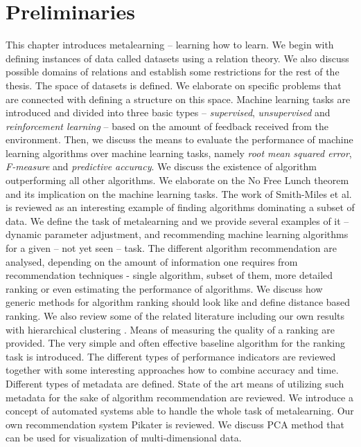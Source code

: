\chapter{Preliminaries}
\label{chapter:preliminaries}
This chapter introduces metalearning -- learning how to learn. We begin with defining instances of data called datasets using a relation theory. We also discuss possible domains of relations and establish some restrictions for the rest of the thesis. The space of datasets is defined. We elaborate on specific problems that are connected with defining a structure on this space. Machine learning tasks are introduced and divided into three basic types -- \emph{supervised}, \emph{unsupervised} and \emph{reinforcement learning} -- based on the amount of feedback received from the environment. Then, we discuss the means to evaluate the performance of machine learning algorithms over machine learning tasks, namely \emph{root mean squared error}, \emph{F-measure} and \emph{predictive accuracy}. We discuss the existence of algorithm outperforming all other algorithms. We elaborate on the No Free Lunch theorem \cite{NoFreeLunchTheorem} and its implication on the machine learning tasks. The work of Smith-Miles et al. is reviewed \cite{SmithMilesTowardsMeasuresOfAlgorithmPerformance} as an interesting example of finding algorithms dominating a subset of data. We define the task of metalearning and we provide several examples of it -- dynamic parameter adjustment, and recommending machine learning algorithms for a given -- not yet seen -- task. The different algorithm recommendation are analysed, depending on the amount of information one requires from recommendation techniques - single algorithm, subset of them, more detailed ranking or even estimating the performance of algorithms. We discuss how generic methods for algorithm ranking should look like and define distance based ranking. We also review some of the related literature including our own results with hierarchical clustering \cite{jaICMLA2013}. Means of measuring the quality of a ranking are provided. The very simple and often effective baseline algorithm for the ranking task is introduced. The different types of performance indicators are reviewed together with some interesting approaches how to combine accuracy and time. Different types of metadata are defined. State of the art means of utilizing such metadata for the sake of algorithm recommendation are reviewed. We introduce a concept of automated systems able to handle the whole task of metalearning. Our own recommendation system Pikater is reviewed. We discuss PCA \cite{pca} method that can be used for visualization of multi-dimensional data.

